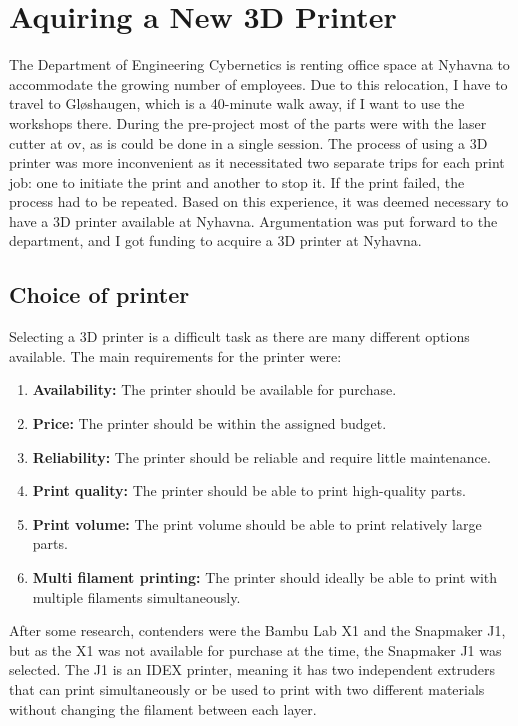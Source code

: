 \section{Aquiring a New 3D Printer}
The Department of Engineering Cybernetics is renting office space at Nyhavna to accommodate the growing number of employees.
Due to this relocation, I have to travel to Gløshaugen, which is a 40-minute walk away, if I want to use the workshops there.
During the pre-project most of the parts were with the laser cutter at \gls{ov}, as is could be done in a single session.
The process of using a 3D printer was more inconvenient as it necessitated two separate trips for each print job: one to initiate the print and another to stop it.
If the print failed, the process had to be repeated.
Based on this experience, it was deemed necessary to have a 3D printer available at Nyhavna.
Argumentation was put forward to the department, and I got funding to acquire a 3D printer at Nyhavna.

\subsection{Choice of printer}
Selecting a 3D printer is a difficult task as there are many different options available.
The main requirements for the printer were:
\begin{enumerate}
    \item \textbf{Availability:} The printer should be available for purchase.
    \item \textbf{Price:} The printer should be within the assigned budget.
    \item \textbf{Reliability:} The printer should be reliable and require little maintenance.
    \item \textbf{Print quality:} The printer should be able to print high-quality parts.
    \item \textbf{Print volume:} The print volume should be able to print relatively large parts.
    \item \textbf{Multi filament printing:} The printer should ideally be able to print with multiple filaments simultaneously.
\end{enumerate}

After some research, contenders were the Bambu Lab X1 and the Snapmaker J1, but as the X1 was not available for purchase at the time, the Snapmaker J1 was selected.
The J1 is an IDEX printer, meaning it has two independent extruders that can print simultaneously or be used to print with two different materials without changing the filament between each layer.

